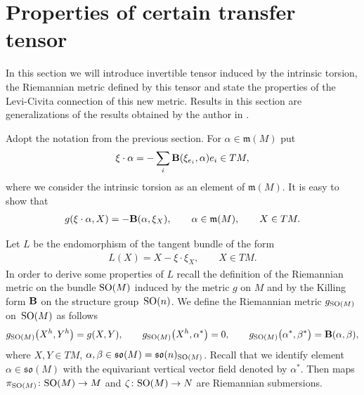 \documentclass[10pt,a4paper]{amsart}
\numberwithin{equation}{section}
\begin{document}
\section{Properties of certain transfer tensor}\label{section4}

In this section we will introduce invertible tensor induced by the intrinsic torsion, the Riemannian metric def\/ined by this tensor and state the properties of the Levi-Civita connection of this new metric. Results in this section are generalizations of the results obtained by the author in \cite{kn}.

Adopt the notation from the previous section. For $\alpha\in \mathfrak{m}(M)$ put
\begin{gather*}
\xi\cdot \alpha=-\sum_i {\bf B}(\xi_{e_i},\alpha)e_i\in TM,
\end{gather*}
where we consider the intrinsic torsion as an element of $\mathfrak{m}(M)$. It is easy to show that
\begin{gather}\label{eq:xidotT}
g(\xi\cdot \alpha,X)=-{\bf B}(\alpha,\xi_X),\qquad \alpha\in\mathfrak{m}(M),\qquad X\in TM.
\end{gather}

Let $L$ be the endomorphism of the tangent bundle of the form
\begin{gather*}
L(X)=X-\xi\cdot \xi_X,\qquad X\in TM.
\end{gather*}
In order to derive some properties of $L$ recall the def\/inition of the Riemannian metric on the bundle ${\rm SO}(M)$ induced by the metric $g$ on $M$ and by the Killing form ${\bf B}$ on the structure group~${\rm SO}(n)$. We def\/ine the Riemannian metric $g_{{\rm SO}(M)}$ on~${\rm SO}(M)$ as follows
\begin{gather*}
g_{{\rm SO}(M)}\big(X^h,Y^h\big) =g(X,Y), \qquad
g_{{\rm SO}(M)}\big(X^h,\alpha^{\ast}\big) =0, \qquad
g_{{\rm SO}(M)}\big(\alpha^{\ast},\beta^{\ast}\big) ={\bf B}(\alpha,\beta),
\end{gather*}
where $X,Y\in TM$, $\alpha,\beta\in\mathfrak{so}(M)=\mathfrak{so}(n)_{{\rm SO}(M)}$. Recall that we identify element $\alpha\in \mathfrak{so}(M)$ with the equivariant vertical vector f\/ield denoted by $\alpha^{\ast}$. Then maps $\pi_{{\rm SO}(M)}\colon {\rm SO}(M)\to M$ and $\zeta\colon {\rm SO}(M)\to N$ are Riemannian submersions.
\end{document}

